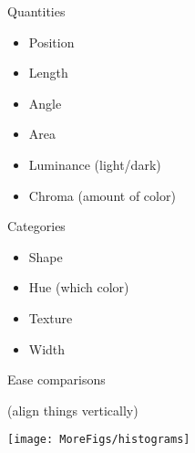 \documentclass[12pt]{article}\usepackage[]{graphicx}\usepackage[]{color}
\makeatletter
\def\maxwidth{ %
  \ifdim\Gin@nat@width>\linewidth
    \linewidth
  \else
    \Gin@nat@width
  \fi
}
\newenvironment{knitrout}{}{} %
\newcommand{\headsize}{\fontsize{35}{35} \selectfont}
\newcommand{\smallsize}{\fontsize{25}{30} \selectfont}
\newcommand{\smallersize}{\fontsize{20}{25} \selectfont}
\makeatother
\begin{document}
\smallersize \color{mywhite}
\hspace{1in} \begin{minipage}[t]{4in}
\vspace*{0mm}

{\smallsize \color{mypink} Quantities}
\vspace{5mm}

\begin{itemize}
\item Position
\item Length
\item Angle
\item Area
\item Luminance {\color{myblue} (light/dark)}
\item Chroma {\color{myblue} (amount of color)}
\end{itemize}

\end{minipage}
\hfill
\begin{minipage}[t]{4in}
\vspace*{0mm}

{\smallsize \color{mypink} Categories}
\vspace{5mm}

\begin{itemize}
\item Shape
\item Hue {\color{myblue} (which color)}
\item Texture
\item Width
\end{itemize}

\end{minipage}

\newpage


\headsize \color{myyellow}
\hfill
\begin{minipage}{6.25in}
\centering
Ease comparisons

\bigskip

\color{myblue} \smallersize
(align things vertically)
\end{minipage}

\vfill

\begin{knitrout}
\color{fgcolor}

{\centering \texttt{[image: MoreFigs/histograms]} 

}



\end{knitrout}
\end{document}
